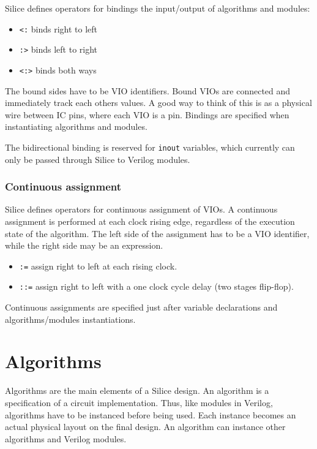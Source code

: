 \documentclass[a4]{article}
\newcommand\todo[1]{{\color{magenta}\textbf{TODO:} #1}}
\newcommand\verilog{Verilog}
\newcommand\silice{Silice}
\begin{document}
\silice{} defines operators for bindings the input/output of algorithms and modules:
\begin{itemize}
	\item \texttt{<:} binds right to left
	\item \texttt{:>} binds left to right
	\item \texttt{<:>} binds both ways %
\end{itemize}

The bound sides have to be VIO identifiers. 
Bound VIOs are connected and immediately track each others values.
A good way to think of this is as a physical wire between IC pins, where each VIO is a pin.
Bindings are specified when instantiating algorithms and modules. 

The bidirectional binding is reserved for \texttt{inout} variables, which currently can only be
passed through \silice{} to \verilog{} modules.

\subsubsection{Continuous assignment}
\label{sec:contassign}

\silice{} defines operators for continuous assignment of VIOs.
A continuous assignment is performed at each clock rising edge, regardless of the 
execution state of the algorithm. The left side of the assignment has to be a VIO identifier,
while the right side may be an expression.
\begin{itemize}
\item \texttt{:=} assign right to left at each rising clock.
\item \texttt{::=} assign right to left with a one clock cycle delay (two stages flip-flop).
\end{itemize}

Continuous assignments are specified just after variable declarations and algorithms/modules instantiations.


\section{Algorithms}

Algorithms are the main elements of a \silice{} design. An algorithm is a specification of a circuit implementation. Thus, like modules in \verilog{}, algorithms have to be instanced before being used. Each instance becomes an actual physical layout on the final design.
An algorithm can instance other algorithms and \verilog{} modules. 
\end{document}
